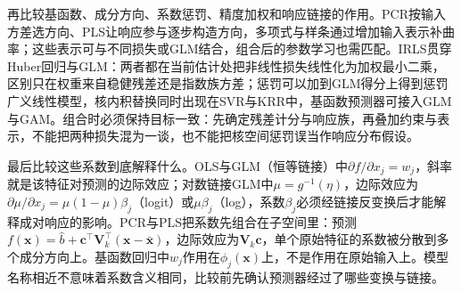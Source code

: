 再比较基函数、成分方向、系数惩罚、精度加权和响应链接的作用。PCR按输入方差选方向、PLS让响应参与逐步构造方向，多项式与样条通过增加输入表示补曲率；这些表示可与不同损失或GLM结合，组合后的参数学习也需匹配。IRLS贯穿Huber回归与GLM：两者都在当前估计处把非线性损失线性化为加权最小二乘，区别只在权重来自稳健残差还是指数族方差；惩罚可以加到GLM得分上得到惩罚广义线性模型，核内积替换同时出现在SVR与KRR中，基函数预测器可接入GLM与GAM。组合时必须保持目标一致：先确定残差计分与响应族，再叠加约束与表示，不能把两种损失混为一谈，也不能把核空间惩罚误当作响应分布假设。

最后比较这些系数到底解释什么。OLS与GLM（恒等链接）中$\partial f/\partial x_j=w_j$，斜率就是该特征对预测的边际效应；对数链接GLM中$\mu=g^{-1}(\eta)$，边际效应为$\partial\mu/\partial x_j=\mu(1-\mu)\beta_j$（logit）或$\mu\beta_j$（log），系数$\beta_j$必须经链接反变换后才能解释成对响应的影响。PCR与PLS把系数先组合在子空间里：预测$f(\bm{x})=\widehat b+\bm{c}^{\top}\bm{V}_k^{\top}(\bm{x}-\bar{\bm{x}})$，边际效应为$\bm{V}_k\bm{c}$，单个原始特征的系数被分散到多个成分方向上。基函数回归中$w_j$作用在$\phi_j(\bm{x})$上，不是作用在原始输入上。模型名称相近不意味着系数含义相同，比较前先确认预测器经过了哪些变换与链接。

